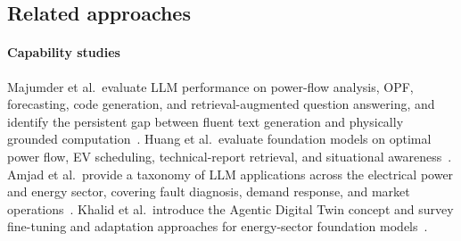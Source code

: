 \documentclass[journal,onecolumn]{IEEEtran} %
\begin{document}
\subsection{Related approaches}
\label{sec:related}

\paragraph{Capability studies}
Majumder et al.\ evaluate LLM performance on power-flow analysis, OPF, forecasting, code generation, and retrieval-augmented question answering, and identify the persistent gap between fluent text generation and physically grounded computation~\cite{majumder2024electric}. Huang et al.\ evaluate foundation models on optimal power flow, EV scheduling, technical-report retrieval, and situational awareness~\cite{huang2024foundation}. Amjad et al.\ provide a taxonomy of LLM applications across the electrical power and energy sector, covering fault diagnosis, demand response, and market operations~\cite{amjad2025review}. Khalid et al.\ introduce the Agentic Digital Twin concept and survey fine-tuning and adaptation approaches for energy-sector foundation models~\cite{agentic_dt_2025}.
\end{document}
